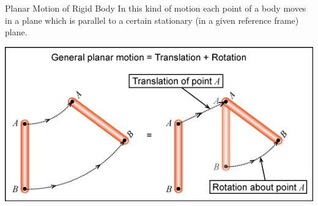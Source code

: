 \documentclass[18pt]{LectMechanics}
\begin{document}
\begin{frame}{Planar Motion of Rigid Body}{}
		In this kind of motion each point 
		of a body moves in a plane which is parallel to a certain 
		stationary (in a given reference frame) plane. 
		\begin{center}
			\includegraphics[width=\linewidth]{Planar_Motion}
		\end{center}
\end{frame}
\end{document}
